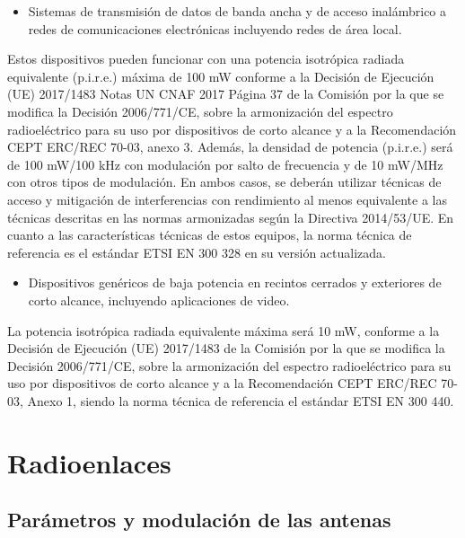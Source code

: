 \documentclass{article}
\begin{document}
\begin{itemize}

    \item Sistemas de transmisión de datos de banda ancha y de acceso inalámbrico
    a redes de comunicaciones electrónicas incluyendo redes de área local.

\end{itemize}

    Estos dispositivos pueden funcionar con una potencia isotrópica radiada equivalente
    (p.i.r.e.) máxima de 100 mW conforme a la Decisión de Ejecución (UE) 2017/1483
    Notas UN CNAF 2017 Página 37
    de la Comisión por la que se modifica la Decisión 2006/771/CE, sobre la
    armonización del espectro radioeléctrico para su uso por dispositivos de corto
    alcance y a la Recomendación CEPT ERC/REC 70-03, anexo 3.
    Además, la densidad de potencia (p.i.r.e.) será de 100 mW/100 kHz con modulación
    por salto de frecuencia y de 10 mW/MHz con otros tipos de modulación. En ambos
    casos, se deberán utilizar técnicas de acceso y mitigación de interferencias con
    rendimiento al menos equivalente a las técnicas descritas en las normas
    armonizadas según la Directiva 2014/53/UE.
    En cuanto a las características técnicas de estos equipos, la norma técnica de
    referencia es el estándar ETSI EN 300 328 en su versión actualizada.

\begin{itemize}
    \item Dispositivos genéricos de baja potencia en recintos cerrados y exteriores
    de corto alcance, incluyendo aplicaciones de video.
\end{itemize}
    La potencia isotrópica radiada equivalente máxima será 10 mW, conforme a la
    Decisión de Ejecución (UE) 2017/1483 de la Comisión por la que se modifica la
    Decisión 2006/771/CE, sobre la armonización del espectro radioeléctrico para su uso
    por dispositivos de corto alcance y a la Recomendación CEPT ERC/REC 70-03,
    Anexo 1, siendo la norma técnica de referencia el estándar ETSI EN 300 440. 


\section{Radioenlaces}

\subsection{Parámetros y modulación de las antenas}
\end{document}
